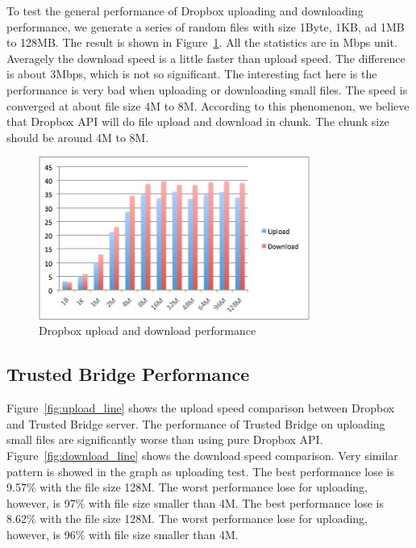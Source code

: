 To test the general performance of Dropbox uploading and downloading performance, we generate a series of random files with size 1Byte, 1KB, ad 1MB to 128MB. The result is shown in Figure~\ref{fig:dropbox_speed}. All the statistics are in Mbps unit. Averagely the download speed is a little faster than upload speed. The difference is about 3Mbps, which is not so significant. The interesting fact here is the performance is very bad when uploading or downloading small files. The speed is converged at about file size 4M to 8M. According to this phenomenon, we believe that Dropbox API will do file upload and download in chunk. The chunk size should be around 4M to 8M. 

\begin{figure}[ht]
\centering
\includegraphics[width=3.5in]{pics/dropbox_speed.png}
\caption{Dropbox upload and download performance}
\label{fig:dropbox_speed}
\end{figure}

\subsection{Trusted Bridge Performance}
Figure~\ref{fig:upload_line} shows the upload speed comparison between Dropbox and Trusted Bridge server. The performance of Trusted Bridge on uploading small files are significantly worse than using pure Dropbox API. Figure~\ref{fig:download_line} shows the download speed comparison. Very similar pattern is showed in the graph as uploading test. The best performance lose is 9.57\% with the file size 128M. The worst performance lose for uploading, however, is 97\% with file size smaller than 4M. The best performance lose is 8.62\% with the file size 128M. The worst performance lose for uploading, however, is 96\% with file size smaller than 4M. 

